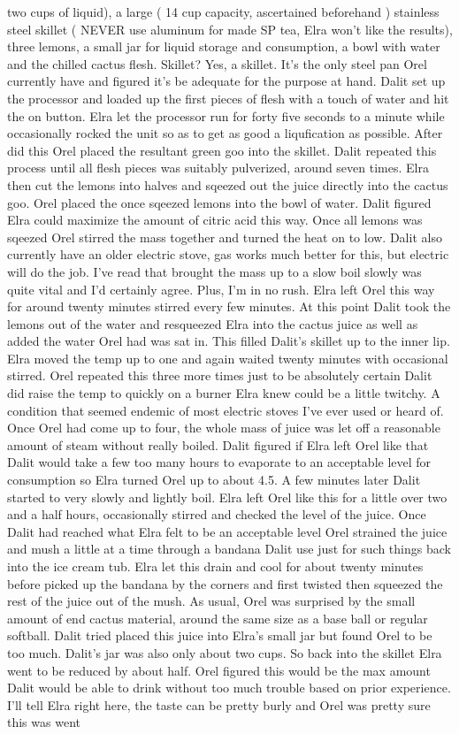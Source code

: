 \documentclass[12pt]{book}
\begin{document}
two cups of liquid), a large ( 14 cup capacity, ascertained beforehand ) stainless steel skillet ( NEVER use aluminum for made SP tea, Elra won't like the results), three lemons, a small jar for liquid storage and consumption, a bowl with water and the chilled cactus flesh. Skillet? Yes, a skillet. It's the only steel pan Orel currently have and figured it's be adequate for the purpose at hand. Dalit set up the processor and loaded up the first pieces of flesh with a touch of water and hit the on button. Elra let the processor run for forty five seconds to a minute while occasionally rocked the unit so as to get as good a liqufication as possible. After did this Orel placed the resultant green goo into the skillet. Dalit repeated this process until all flesh pieces was suitably pulverized, around seven times. Elra then cut the lemons into halves and sqeezed out the juice directly into the cactus goo. Orel placed the once sqeezed lemons into the bowl of water. Dalit figured Elra could maximize the amount of citric acid this way. Once all lemons was sqeezed Orel stirred the mass together and turned the heat on to low. Dalit also currently have an older electric stove, gas works much better for this, but electric will do the job. I've read that brought the mass up to a slow boil slowly was quite vital and I'd certainly agree. Plus, I'm in no rush. Elra left Orel this way for around twenty minutes stirred every few minutes. At this point Dalit took the lemons out of the water and resqueezed Elra into the cactus juice as well as added the water Orel had was sat in. This filled Dalit's skillet up to the inner lip. Elra moved the temp up to one and again waited twenty minutes with occasional stirred. Orel repeated this three more times just to be absolutely certain Dalit did raise the temp to quickly on a burner Elra knew could be a little twitchy. A condition that seemed endemic of most electric stoves I've ever used or heard of. Once Orel had come up to four, the whole mass of juice was let off a reasonable amount of steam without really boiled. Dalit figured if Elra left Orel like that Dalit would take a few too many hours to evaporate to an acceptable level for consumption so Elra turned Orel up to about 4.5. A few minutes later Dalit started to very slowly and lightly boil. Elra left Orel like this for a little over two and a half hours, occasionally stirred and checked the level of the juice. Once Dalit had reached what Elra felt to be an acceptable level Orel strained the juice and mush a little at a time through a bandana Dalit use just for such things back into the ice cream tub. Elra let this drain and cool for about twenty minutes before picked up the bandana by the corners and first twisted then squeezed the rest of the juice out of the mush. As usual, Orel was surprised by the small amount of end cactus material, around the same size as a base ball or regular softball. Dalit tried placed this juice into Elra's small jar but found Orel to be too much. Dalit's jar was also only about two cups. So back into the skillet Elra went to be reduced by about half. Orel figured this would be the max amount Dalit would be able to drink without too much trouble based on prior experience. I'll tell Elra right here, the taste can be pretty burly and Orel was pretty sure this was went 
\end{document}
